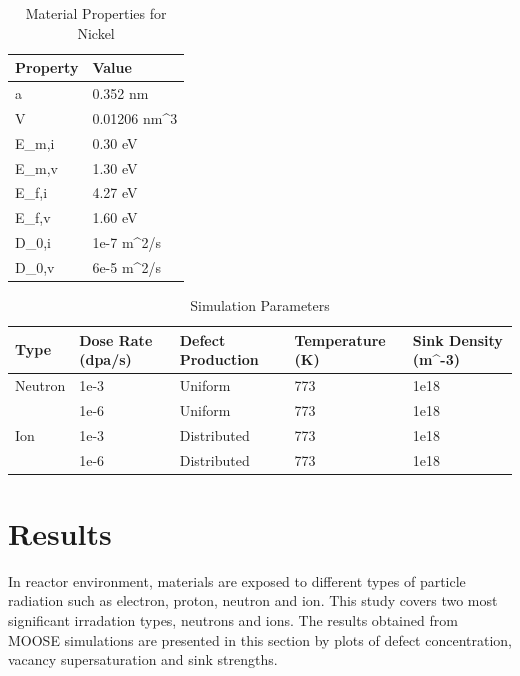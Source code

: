 \documentclass[a4paper]{article}
\begin{document}
\begin{table}[h!]
  \centering
  \caption{Material Properties for Nickel\cite{walgraef1996}}
  \label{table:Ni_material_properties}
  \begin{tabular}{ ||p{2cm}|p{2cm}||  }
     \hline
     Property & Value\\
     \hline\hline
     a  & 0.352 nm\\
     V  & 0.01206 nm^3\\
     E_{m,i}  & 0.30 eV\\
     E_{m,v}  & 1.30 eV\\
     E_{f,i}  & 4.27 eV\\
     E_{f,v}  & 1.60 eV\\
     D_{0,i}  & 1e-7 m^2/s\\
     D_{0,v}  & 6e-5 m^2/s\\

     \hline
  \end{tabular}
\end{table}

\begin{table}[h!]
  \centering
  \caption{Simulation Parameters}
  \label{table:simulation_parameters}
  \begin{tabular}{ ||p{2cm}|p{3cm}|p{3cm}|p{3cm}|p{3cm}||  }
     \hline
     Type & Dose Rate (dpa/s) & Defect Production & Temperature (K) & Sink Density (m^{-3})\\
     \hline
     \hline
     Neutron  & 1e-3  & Uniform     & 773 & 1e18\\
              & 1e-6  & Uniform     & 773 & 1e18\\
     \hline
     Ion      & 1e-3  & Distributed & 773 & 1e18\\
              & 1e-6  & Distributed & 773 & 1e18\\
     \hline
  \end{tabular}
\end{table}

\newpage
\section{Results} \hspace{10pt}

In reactor environment, materials are exposed to different types of particle radiation such as electron, proton, neutron and ion. This study covers two most significant irradation types, neutrons and ions. The results obtained from MOOSE simulations are presented in this section by plots of defect concentration, vacancy supersaturation and sink strengths. %
\end{document}
